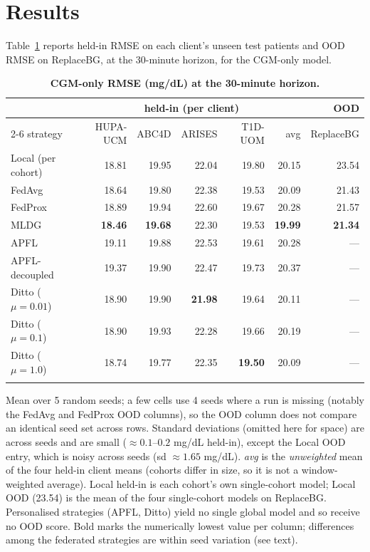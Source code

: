\documentclass[10pt,letterpaper]{article}
\newlength\savedwidth
\newcommand\thickhline{\noalign{\global\savedwidth\arrayrulewidth\global\arrayrulewidth 2pt}%
\hline
\noalign{\global\arrayrulewidth\savedwidth}}
\begin{document}
\section*{Results}

Table~\ref{tab:main} reports held-in RMSE on each client's unseen test patients
and OOD RMSE on ReplaceBG, at the 30-minute horizon, for the CGM-only model.

\begin{table}[!ht]
\centering
\captionsetup{justification=centering,singlelinecheck=on}
\caption{\bf CGM-only RMSE (mg/dL) at the 30-minute horizon.}
\label{tab:main}
\begin{tabular}{lrrrrrr}
\thickhline
 & \multicolumn{5}{c}{held-in (per client)} & OOD \\
\cline{2-6}
strategy & HUPA-UCM & ABC4D & ARISES & T1D-UOM & avg & ReplaceBG \\
\hline
Local (per cohort) & 18.81 & 19.95 & 22.04 & 19.80 & 20.15 & 23.54 \\
\hline
FedAvg  & 18.64 & 19.80 & 22.38 & 19.53 & 20.09 & 21.43 \\
FedProx & 18.89 & 19.94 & 22.60 & 19.67 & 20.28 & 21.57 \\
MLDG    & \textbf{18.46} & \textbf{19.68} & 22.30 & 19.53 & \textbf{19.99} & \textbf{21.34} \\
\hline
APFL          & 19.11 & 19.88 & 22.53 & 19.61 & 20.28 & --- \\
APFL-decoupled & 19.37 & 19.90 & 22.47 & 19.73 & 20.37 & --- \\
Ditto ($\mu{=}0.01$) & 18.90 & 19.90 & \textbf{21.98} & 19.64 & 20.11 & --- \\
Ditto ($\mu{=}0.1$)  & 18.90 & 19.93 & 22.28 & 19.66 & 20.19 & --- \\
Ditto ($\mu{=}1.0$)  & 18.74 & 19.77 & 22.35 & \textbf{19.50} & 20.09 & --- \\
\thickhline
\end{tabular}
\begin{center}
{\small Mean over 5 random seeds; a few cells use 4 seeds where a run is missing
(notably the FedAvg and FedProx OOD columns), so the OOD column does not compare
an identical seed set across rows. Standard deviations (omitted here for space)
are across seeds and are small ($\approx 0.1$--$0.2$ mg/dL held-in), except the
Local OOD entry, which is noisy across seeds (sd $\approx 1.65$ mg/dL). \emph{avg}
is the \emph{unweighted} mean of the four held-in client means (cohorts differ in
size, so it is not a window-weighted average). Local held-in is each cohort's own
single-cohort model; Local OOD (23.54) is the mean of the four single-cohort
models on ReplaceBG. Personalised strategies (APFL, Ditto) yield no single
global model and so receive no OOD score. Bold marks the numerically lowest value
per column; differences among the federated strategies are within seed variation
(see text).}
\end{center}
\end{table}
\end{document}
